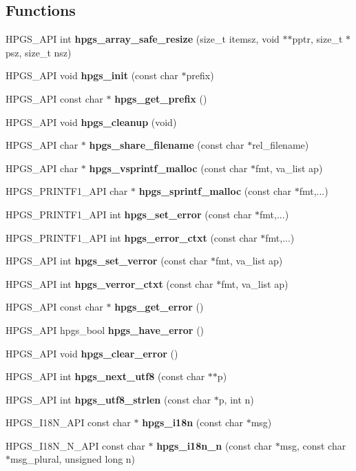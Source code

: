 \subsection*{Functions}
\begin{CompactItemize}
\item 
HPGS\_\-API int {\bf hpgs\_\-array\_\-safe\_\-resize} (size\_\-t itemsz, void $\ast$$\ast$pptr, size\_\-t $\ast$psz, size\_\-t nsz)
\item 
HPGS\_\-API void {\bf hpgs\_\-init} (const char $\ast$prefix)
\item 
HPGS\_\-API const char $\ast$ {\bf hpgs\_\-get\_\-prefix} ()
\item 
HPGS\_\-API void {\bf hpgs\_\-cleanup} (void)
\item 
HPGS\_\-API char $\ast$ {\bf hpgs\_\-share\_\-filename} (const char $\ast$rel\_\-filename)
\item 
HPGS\_\-API char $\ast$ {\bf hpgs\_\-vsprintf\_\-malloc} (const char $\ast$fmt, va\_\-list ap)
\item 
HPGS\_\-PRINTF1\_\-API char $\ast$ {\bf hpgs\_\-sprintf\_\-malloc} (const char $\ast$fmt,...)
\item 
HPGS\_\-PRINTF1\_\-API int {\bf hpgs\_\-set\_\-error} (const char $\ast$fmt,...)
\item 
HPGS\_\-PRINTF1\_\-API int {\bf hpgs\_\-error\_\-ctxt} (const char $\ast$fmt,...)
\item 
HPGS\_\-API int {\bf hpgs\_\-set\_\-verror} (const char $\ast$fmt, va\_\-list ap)
\item 
HPGS\_\-API int {\bf hpgs\_\-verror\_\-ctxt} (const char $\ast$fmt, va\_\-list ap)
\item 
HPGS\_\-API const char $\ast$ {\bf hpgs\_\-get\_\-error} ()
\item 
HPGS\_\-API hpgs\_\-bool {\bf hpgs\_\-have\_\-error} ()
\item 
HPGS\_\-API void {\bf hpgs\_\-clear\_\-error} ()
\item 
HPGS\_\-API int {\bf hpgs\_\-next\_\-utf8} (const char $\ast$$\ast$p)
\item 
HPGS\_\-API int {\bf hpgs\_\-utf8\_\-strlen} (const char $\ast$p, int n)
\item 
HPGS\_\-I18N\_\-API const char $\ast$ \textbf{hpgs\_\-i18n} (const char $\ast$msg)\label{group__base_g3b14be33eec8c80d111a4394efcbf008}

\item 
HPGS\_\-I18N\_\-N\_\-API const char $\ast$ \textbf{hpgs\_\-i18n\_\-n} (const char $\ast$msg, const char $\ast$msg\_\-plural, unsigned long n)\label{group__base_gc841286219f60f4198b3fb3c869f9e5e}


\end{CompactItemize}

